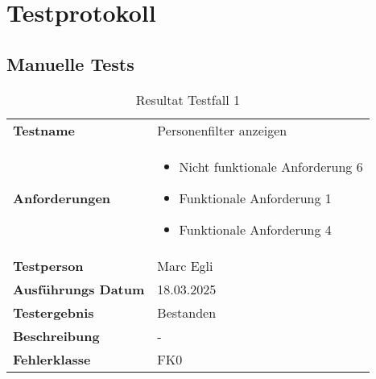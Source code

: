 \section{Testprotokoll}

\subsection{Manuelle Tests}

\begin{table}[H]
    \begin{tabular}{|L{0.3\textwidth}|L{0.65\textwidth}|}
        \hline
           \\[10pt]
        \hline
        \textbf{Testname} & Personenfilter anzeigen \\
        \hline
        \textbf{Anforderungen} & 
        \begin{itemize}
            \item Nicht funktionale Anforderung 6
            \item Funktionale Anforderung 1
            \item Funktionale Anforderung 4
        \end{itemize} \\
        \hline
        \textbf{Testperson} & Marc Egli \\
        \hline
        \textbf{Ausführungs Datum} & 18.03.2025 \\
        \hline
        \textbf{Testergebnis} & Bestanden \\
        \hline
        \textbf{Beschreibung} & - \\ 
        \hline
        \textbf{Fehlerklasse} & FK0 \\ 
        \hline
    \end{tabular}
    \caption{Resultat Testfall 1}
\end{table}

